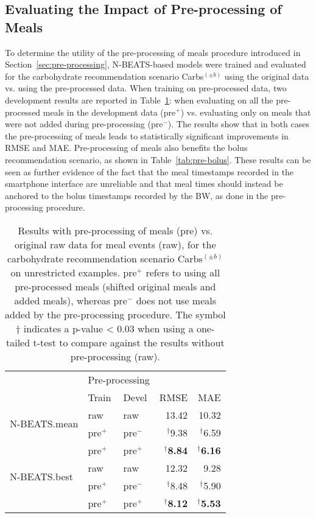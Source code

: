 \subsection{Evaluating the Impact of Pre-processing of Meals}
\label{sec:pre-evaluation}

To determine the utility of the pre-processing of meals procedure introduced in Section~\ref{sec:pre-processing}, \ac{N-BEATS}-based models were trained and evaluated for the carbohydrate recommendation scenario Carbs$^{(\pm b)}$ using the original data vs. using the pre-processed data. When training on pre-processed data, two development results are reported in Table~\ref{tab:pre-carbs}: when evaluating on all the pre-processed meals in the development data (pre$^+$)  vs. evaluating only on meals that were not added during pre-processing (pre$^-$). The results show that in both cases the pre-processing of meals leads to statistically significant improvements in \ac{RMSE} and \ac{MAE}. Pre-processing of meals also benefits the bolus recommendation scenario, as shown in Table~\ref{tab:pre-bolus}. These results can be seen as further evidence of the fact that the meal timestamps recorded in the smartphone interface are unreliable and that meal times should instead be anchored to the bolus timestamps recorded by the \ac{BW}, as done in the pre-processing procedure.

\begin{table}[ht]
\setlength{\tabcolsep}{4pt}
\caption{Results with pre-processing of meals (pre) vs. original raw data for meal events (raw), for the carbohydrate recommendation scenario Carbs$^{(\pm b)}$ on unrestricted examples. pre$^+$ refers to using all pre-processed meals (shifted original meals and added meals), whereas pre$^-$ does not use meals added by the pre-processing procedure. The symbol $\dagger$ indicates a p-value < 0.03 when using a one-tailed t-test to compare against the results without pre-processing (raw).}
\begin{center}
\label{tab:pre-carbs}
\small
\begin{tabular}{|l|ll|rr|}
    \cline{2-3}
    \multicolumn{1}{c|}{} & \multicolumn{2}{c|}{Pre-processing} &  \multicolumn{2}{c}{} \\
    \cline{2-5}
	\multicolumn{1}{c|}{} & Train & Devel & RMSE & MAE\\
    \hline
    \multirow{2}{*}{N-BEATS.mean} & raw & raw & 13.42 & 10.32\\
	& pre$^+$ & pre$^-$ & $^\dagger$9.38 & $^\dagger$6.59\\
	& pre$^+$ & pre$^+$ & $^\dagger${\bf 8.84} & $^\dagger${\bf 6.16}\\
    \hline
    \multirow{2}{*}{N-BEATS.best} & raw & raw & 12.32 & 9.28\\
    & pre$^+$ & pre$^-$ & $^\dagger$8.48 & $^\dagger$5.90\\
    & pre$^+$ & pre$^+$ & $^\dagger${\bf 8.12} & $^\dagger${\bf 5.53}\\
    \hline
\end{tabular}
\end{center}
\end{table}

